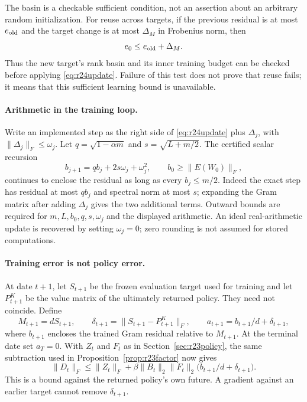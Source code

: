 The basin is a checkable sufficient condition, not an assertion about an
arbitrary random initialization. For reuse across targets, if the previous
residual is at most $e_{\rm old}$ and the target change is at most
$\Delta_M$ in Frobenius norm, then
\begin{equation}
 e_0\leq e_{\rm old}+\Delta_M.
 \label{eq:r24warm}
\end{equation}
Thus the new target's rank basin and its inner training budget can be checked
before applying \eqref{eq:r24update}. Failure of this test does not prove
that reuse fails; it means that this sufficient learning bound is unavailable.

\paragraph{Arithmetic in the training loop.}
Write an implemented step as the right side of \eqref{eq:r24update} plus
$\Delta_j$, with $\|\Delta_j\|_F\leq\omega_j$. Let
$q=\sqrt{1-\alpha m}$ and $s=\sqrt{L+m/2}$. The certified scalar recursion
\begin{equation}
 b_{j+1}=q b_j+2s\omega_j+\omega_j^2,
 \qquad b_0\geq\|E(W_0)\|_F,
 \label{eq:r24arithmetic}
\end{equation}
continues to enclose the residual as long as every $b_j\leq m/2$.
Indeed the exact step has residual at most $q b_j$ and spectral norm at
most $s$; expanding the Gram matrix after adding $\Delta_j$ gives the two
additional terms. Outward bounds are required for $m,L,b_0,q,s,\omega_j$
and the displayed arithmetic. An ideal real-arithmetic update is recovered
by setting $\omega_j=0$; zero rounding is not assumed for stored computations.

\paragraph{Training error is not policy error.}
At date $t+1$, let $S_{t+1}$ be the frozen evaluation target used for
training and let $P_{t+1}^K$ be the value matrix of the ultimately returned
policy. They need not coincide. Define
\begin{equation}
 M_{t+1}=dS_{t+1},\qquad
 \delta_{t+1}=\|S_{t+1}-P_{t+1}^K\|_F,
 \qquad a_{t+1}=b_{t+1}/d+\delta_{t+1},
 \label{eq:r24drift}
\end{equation}
where $b_{t+1}$ encloses the trained Gram residual relative to $M_{t+1}$.
At the terminal date set $a_T=0$. With $Z_t$ and $F_t$ as in
Section~\ref{sec:r23policy}, the same subtraction used in
Proposition~\ref{prop:r23factor} now gives
\begin{equation}
 \|D_t\|_F\leq \|Z_t\|_F+
 \beta\|B_t\|_2\|F_t\|_2
       \bigl(b_{t+1}/d+\delta_{t+1}\bigr).
 \label{eq:r24learningpolicy}
\end{equation}
This is a bound against the returned policy's own future. A gradient against
an earlier target cannot remove $\delta_{t+1}$.

